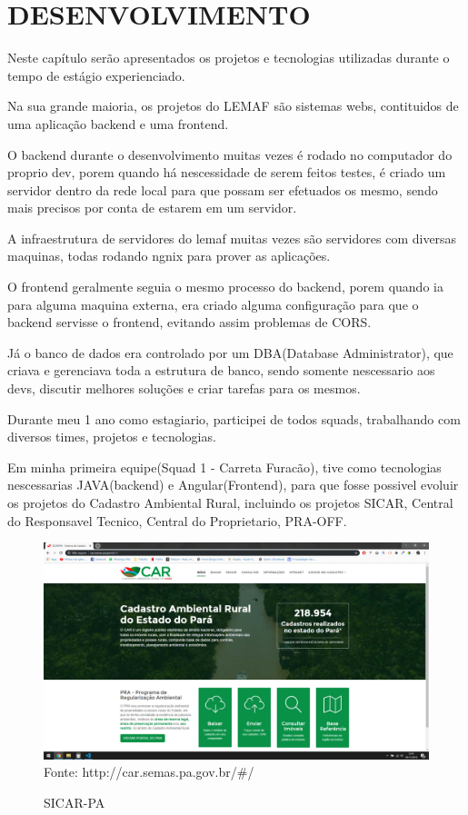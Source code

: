 \chapter{DESENVOLVIMENTO}
\label{cap:desenvolvimento}

Neste capítulo serão apresentados os projetos e tecnologias utilizadas durante o tempo de estágio experienciado.

Na sua grande maioria, os projetos do LEMAF são sistemas webs, contituidos de uma aplicação backend e uma frontend.

O backend durante o desenvolvimento muitas vezes é rodado no computador do proprio dev, porem quando há nescessidade de serem feitos testes, é criado um servidor dentro da rede local para que possam ser efetuados os mesmo, sendo mais precisos por conta de estarem em um servidor.

A infraestrutura de servidores do lemaf muitas vezes são servidores com diversas maquinas, todas rodando ngnix para prover as aplicações.

O frontend geralmente seguia o mesmo processo do backend, porem quando ia para alguma maquina externa, era criado alguma configuração para que o backend servisse o frontend, evitando assim problemas de CORS.

Já o banco de dados era controlado por um DBA(Database Administrator), que criava e gerenciava toda a estrutura de banco, sendo somente nescessario aos devs, discutir melhores soluções e criar tarefas para os mesmos.

Durante meu 1 ano como estagiario, participei de todos squads, trabalhando com diversos times, projetos e tecnologias.

Em minha primeira equipe(Squad 1 - Carreta Furacão), tive como tecnologias nescessarias JAVA(backend) e Angular(Frontend), para que fosse possivel evoluir os projetos do Cadastro Ambiental Rural, incluindo os projetos SICAR, Central do Responsavel Tecnico, Central do Proprietario, PRA-OFF.

\begin{figure}[H]
\centering
\caption{SICAR-PA} %
\includegraphics[scale=0.3]{SICAR}\\  %
{\small Fonte: http://car.semas.pa.gov.br/#/} %
\label{fig:exemplo} %
\end{figure}

